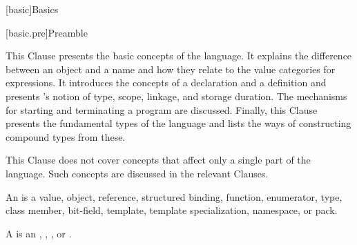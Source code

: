 [basic]{Basics}


[basic.pre]{Preamble}

\pnum
\begin{note}
This Clause presents the basic concepts of the \Cpp{} language.
It explains the difference between an object and a
name and how they relate to the value categories for expressions.
It introduces the concepts of a
declaration and a definition and presents \Cpp{}'s
notion of type, scope, linkage, and
storage duration. The mechanisms for starting and
terminating a program are discussed. Finally, this Clause presents the
fundamental types of the language and lists the ways of constructing
compound types from these.
\end{note}

\pnum
\begin{note}
This Clause does not cover concepts that affect only a single
part of the language. Such concepts are discussed in the relevant
Clauses.
\end{note}

\pnum
{}%
%
%
%
%
An  is a value, object, reference,
structured binding,
function, enumerator, type,
class member, bit-field, template, template specialization, namespace, or
pack.

\pnum
A  is an ,
,
, or
.


